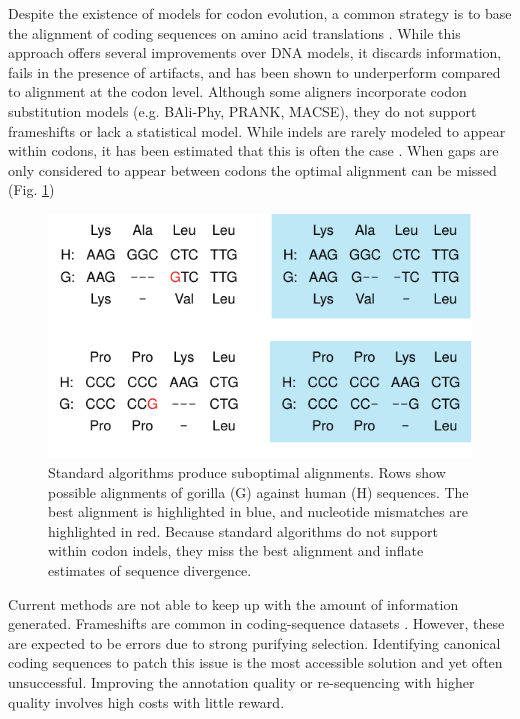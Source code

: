 Despite the existence of models for codon evolution, a common strategy is to
base the alignment of coding sequences on amino acid translations .
While this approach offers several improvements over DNA models, it discards
information, fails in the presence of artifacts, and has been shown to
underperform compared to alignment at the codon level.
Although some aligners incorporate codon substitution models (e.g. BAli-Phy,
PRANK, MACSE), they do not support frameshifts or lack a statistical model.
While indels are rarely modeled to appear within codons, it has been estimated
that this is often the case \parencite{indel_phases_zhu_2019}.
When gaps are only considered to appear between codons the optimal alignment
can be missed (Fig. \ref{fig:indels})

\begin{figure}[h!]
  \begin{minipage}[c]{0.6\textwidth}
    \includegraphics[scale=1]{./figures/fig-aln.pdf}
  \end{minipage}\hfill
  \begin{minipage}[c]{0.4\textwidth}
	\caption{Standard algorithms produce suboptimal alignments.
		Rows show possible alignments of gorilla (G) against human (H) sequences.
		The best alignment is highlighted in blue, and nucleotide mismatches are highlighted in red.
		Because standard algorithms do not support within codon indels, they miss the best
		alignment and inflate estimates of sequence divergence.}
	\label{fig:indels}
  \end{minipage}
\end{figure}

Current methods are not able to keep up with the amount of information
generated.
Frameshifts are common in coding-sequence datasets .
However, these are expected to be errors due to strong purifying selection.
Identifying canonical coding sequences to patch this issue is the most
accessible solution and yet often unsuccessful.
Improving the annotation quality or re-sequencing with higher quality involves
high costs with little reward.

